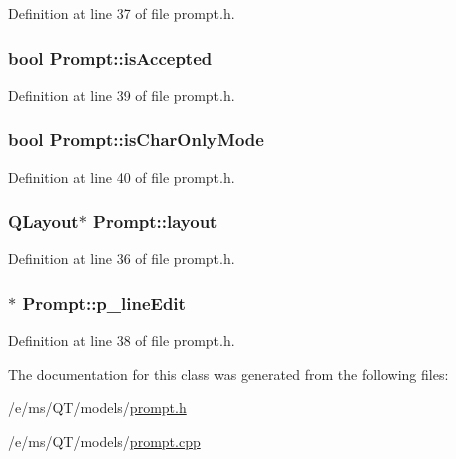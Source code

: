 Definition at line 37 of file prompt.h.

\hypertarget{classPrompt_a9f5af6b368e25cf76125fd694f3d72e3}{
\subsubsection[{isAccepted}]{\setlength{\rightskip}{0pt plus 5cm}bool {\bf Prompt::isAccepted}}}
\label{classPrompt_a9f5af6b368e25cf76125fd694f3d72e3}


Definition at line 39 of file prompt.h.

\hypertarget{classPrompt_a0e000db2a581909f5cfb8928138d6ff0}{
\subsubsection[{isCharOnlyMode}]{\setlength{\rightskip}{0pt plus 5cm}bool {\bf Prompt::isCharOnlyMode}}}
\label{classPrompt_a0e000db2a581909f5cfb8928138d6ff0}


Definition at line 40 of file prompt.h.

\hypertarget{classPrompt_a94a07c07154d88490530bb08bb26f811}{
\subsubsection[{layout}]{\setlength{\rightskip}{0pt plus 5cm}QLayout$\ast$ {\bf Prompt::layout}}}
\label{classPrompt_a94a07c07154d88490530bb08bb26f811}


Definition at line 36 of file prompt.h.

\hypertarget{classPrompt_af52469d5dd32521df6bdedcc3af42964}{
\subsubsection[{p\_\-lineEdit}]{$\ast$ {\bf Prompt::p\_\-lineEdit}}}
\label{classPrompt_af52469d5dd32521df6bdedcc3af42964}


Definition at line 38 of file prompt.h.



The documentation for this class was generated from the following files:\begin{DoxyCompactItemize}
\item 
/e/ms/QT/models/\hyperlink{prompt_8h}{prompt.h}\item 
/e/ms/QT/models/\hyperlink{prompt_8cpp}{prompt.cpp}\end{DoxyCompactItemize}
